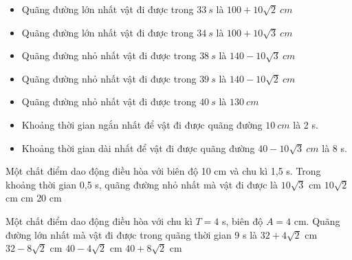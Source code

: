 \begin{vidu}
{\begin{itemize}
\item[8.] Quãng đường lớn nhất vật đi được trong $33\ s$ là $100+10\sqrt{2}\ cm$
\item[9.] Quãng đường lớn nhất vật đi được trong $34\ s$ là $100+10\sqrt{3}\ cm$
\item[10.] Quãng đường nhỏ nhất vật đi được trong $38\ s$ là $140-10\sqrt{3}\ cm$
\item[11.] Quãng đường nhỏ nhất vật đi được trong $39\ s$ là $140-10\sqrt{2}\ cm$
\item[12.] Quãng đường nhỏ nhất vật đi được trong $40\ s$ là $130\ cm$
\item[13.] Khoảng thời gian ngắn nhất để vật đi được quãng đường $10\ cm$ là 2 s.
\item[14.] Khoảng thời gian dài nhất để vật đi được quãng đường $40-10\sqrt{3}\ cm$ là 8 s.
\end{itemize}
}
\end{vidu} 
\begin{vidu}%
Một chất điểm dao động điều hòa với biên độ 10 cm và chu kì 1,5 s. Trong khoảng thời gian 0,5 s, quãng đường nhỏ nhất mà vật đi được là
\choice
{$10\sqrt{3}$ cm}
{$10\sqrt{2}$ cm}
{ cm}
{20 cm}
\end{vidu} %
\begin{vidu}%
Một chất điểm dao động điều hòa với chu kì $T = 4$ s, biên độ $A = 4$ cm. Quãng đường lớn nhất mà vật đi được trong quãng thời gian 9 s là
\choice
{\True $32 + 4\sqrt{2}$ cm}
{$32 - 8\sqrt{2}$ cm}
{$40 - 4\sqrt{2}$ cm}
{$40 + 8\sqrt{2}$ cm}
\end{vidu} %
